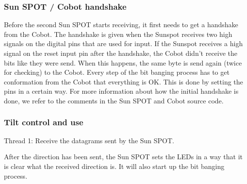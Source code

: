 \documentclass[a4paper,10pt]{article} %
\begin{document}

\subsubsection{Sun SPOT / Cobot handshake} %
\label{ssub:Sun SPOT / Cobot handshake}

Before the second Sun SPOT starts receiving, it first needs to get a handshake
from the Cobot. The handshake is given when the Sunspot receives two high
signals on the digital pins that are used for input. If the Sunspot receives a
high signal on the reset input pin after the handshake, the Cobot didn't receive
the bits like they were send. When this happens, the same byte is send again
(twice for checking) to the Cobot. Every step of the bit banging process has to
get conformation from the Cobot that everything is OK. This is done by setting
the pins in a certain way. For more information about how the initial handshake
is done, we refer to the comments in the Sun SPOT and Cobot source code.


\subsubsection{Tilt control and use} %


Thread 1: Receive the datagrams sent by the Sun SPOT.

After the direction has been sent, the Sun SPOT sets the LEDs in a way that
it is clear what the received direction is. It will also start up the bit
banging process.





\end{document}
